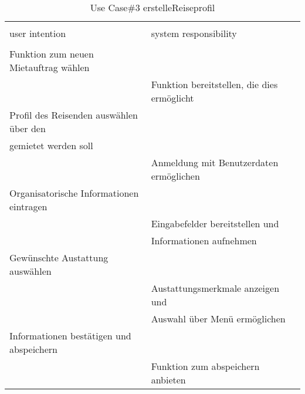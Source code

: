 \begin{table}[H]
\caption{Use Case\#3 erstelleReiseprofil }
\centering
\begin{tabular}{l l}
\\ [-0.5ex]

\hline\hline
\\ [-0.5ex]
user intention & system responsibility
\\ [1.5ex]
\hline
\\ [-0.5ex]
Funktion zum neuen Mietauftrag wählen 		& 												\\[1ex]
											& Funktion bereitstellen, die dies ermöglicht	\\[1ex]
Profil des Reisenden auswählen über den		& 												\\[1ex]
gemietet werden soll          				& 												\\[1ex]
											& Anmeldung mit Benutzerdaten ermöglichen		\\[1ex]
Organisatorische Informationen eintragen	& 											 	\\[1ex] 
											& Eingabefelder bereitstellen und 				\\[1ex]
											& Informationen aufnehmen 						\\[1ex]
Gewünschte Austattung auswählen				& 					 							\\[1ex]
											& Austattungsmerkmale anzeigen und 				\\[1ex]
											& Auswahl über Menü ermöglichen 				\\[1ex]
Informationen bestätigen und abspeichern 	& 												\\[1ex]
										 	& Funktion zum abspeichern anbieten 			\\[1ex]

\hline
\end{tabular}
\label{tab:mietauftragUC}
\end{table}

